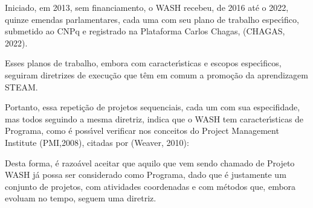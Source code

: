 \documentclass[
12pt,		%
openright,	%
twoside,  %
a4paper,			%
chapter=TITLE,		%
english,			%
french,				%
spanish,			%
brazil				%
]{USPSC-classe/USPSC}
\begin{document}
Iniciado, em 2013, sem financiamento, o WASH recebeu, de 2016 at\'e o 2022, quinze emendas parlamentares, cada uma com seu plano de trabalho espec\'{\i}fico, submetido ao CNPq e registrado na Plataforma Carlos Chagas, (CHAGAS, 2022).

















Esses planos de trabalho, embora com caracter\'{\i}sticas e escopos espec\'{\i}ficos, seguiram diretrizes de execu\c{c}\~ao que t\^em em comum a promo\c{c}\~ao da aprendizagem STEAM.

















Portanto, essa repeti\c{c}\~ao de projetos sequenciais, cada um com sua especifidade, mas todos seguindo a mesma diretriz, indica que o WASH tem caracter\'{\i}sticas de Programa, como \'e poss\'{\i}vel verificar nos conceitos do Project Management Institute  (PMI,2008), citadas por  (Weaver, 2010):


















\noindent\begin{center}\mbox{\centering{}}\end{center}


Desta forma, \'e razo\'avel aceitar que aquilo que vem sendo chamado de Projeto WASH j\'a possa ser considerado como Programa, dado que \'e justamente um conjunto de projetos, com atividades coordenadas e com m\'etodos que, embora evoluam no tempo, seguem uma diretriz.
\end{document}
